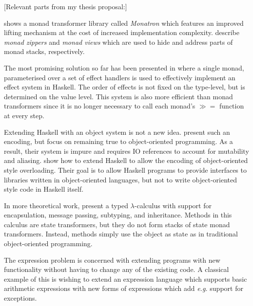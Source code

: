 \documentclass[runningheads,a4paper]{llncs}
\newcommand{\todo}[1]{[{\color{blue}#1}]}
\begin{document}
\todo{Relevant parts from my thesis proposal:}

\cite{jaskelioff2011monatron} shows a monad transformer library called \emph{Monatron} which features an improved lifting mechanism at the cost of increased implementation complexity. \cite{schrijvers2011monads} describe \emph{monad zippers} and \emph{monad views} which are used to hide and address parts of monad stacks, respectively.

The most promising solution so far has been presented in \cite{kiselyov2013extensible} where a single monad, parameterised over a set of effect handlers \cite{plotkin2009handlers} is used to effectively implement an effect system in Haskell. The order of effects is not fixed on the type-level, but is determined on the value level. This system is also more efficient than monad transformers since it is no longer necessary to call each monad's $\gg\!\!=$ function at every step. 



Extending Haskell with an object system is not a new idea. \cite{OOHaskell} present such an encoding, but focus on remaining true to object-oriented programming. As a result, their system is impure and requires IO references to account for mutability and aliasing. \cite{shields2001object} show how to extend Haskell to allow the encoding of object-oriented style overloading. Their goal is to allow Haskell programs to provide interfaces to libraries written in object-oriented languages, but not to write object-oriented style code in Haskell itself.

In more theoretical work, \cite{Pierce93simpletype-theoretic} present a typed $\lambda$-calculus with support for encapsulation, message passing, subtyping, and inheritance. Methods in this calculus are state transformers, but they do not form stacks of state monad transformers. Instead, methods simply use the object as state as in traditional object-oriented programming.

The expression problem \cite{wadler1998expression} is concerned with extending programs with new functionality without having to change any of the existing code. A classical example of this is wishing to extend an expression language which supports basic arithmetic expressions with new forms of expressions which add \emph{e.g.} support for exceptions.  
\end{document}
